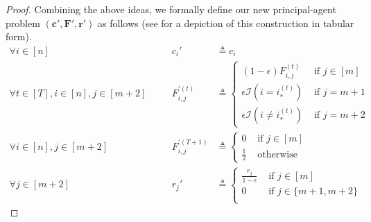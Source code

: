 \documentclass{article}
\newcommand{\indicator}[1]{\mathcal{I}\left(#1\right)}
\newcommand{\costvector}{\bm{c}}
\newcommand{\Cost}[1]{c_{#1}}
\newcommand{\TypedForecast}[3]{F^{(#1)}_{#2, #3}}
\newcommand{\ForecastTensor}{\bm{F}}
\newcommand{\rewardvector}{\bm{r}}
\newcommand{\Reward}[1]{r_{#1}}
\newcommand{\PrincipalAgentProblemPrime}{\left(\costvector', \ForecastTensor', \rewardvector'\right)}
\newcommand{\OptimalAction}{i_*}
\newcommand{\TypedOptimalAction}[1]{\OptimalAction^{(#1)}}
\newcommand{\forecastprime}[3]{F^{\prime(#1)}_{#2, #3}}
\begin{document}
\begin{proof}
  Combining the above ideas, we formally define our new principal-agent problem $\PrincipalAgentProblemPrime$ as follows (see  for a depiction of this construction in tabular form).
  \begin{alignat*}
    \forall i \in [n] \quad
    &&\Cost{i}' &\triangleq \Cost{i} \\
    \forall t \in [T], i \in [n], j \in [m+2] \quad
    &&\forecastprime{t}{i}{j} &\triangleq \begin{cases}
      (1 - \epsilon) \TypedForecast{t}{i}{j}               & \text{ if } j \in [m] \\
      \epsilon \indicator{i = \TypedOptimalAction{t}}      & \text{ if } j = m + 1 \\
      \epsilon \indicator{i \not = \TypedOptimalAction{t}} & \text{ if } j = m + 2
    \end{cases} \\
    \forall i \in [n], j \in [m+2] \quad
    &&\forecastprime{T+1}{i}{j} &\triangleq \begin{cases}
      0       & \text{ if } j \in [m] \\
      \frac12 & \text{ otherwise}
    \end{cases} \\
    \forall j \in [m+2] \quad
    &&\Reward{j}' &\triangleq \begin{cases}
      \frac{\Reward{j}}{1 - \epsilon} & \text{ if } j \in [m] \\
      0                               & \text{ if } j \in \{m+1, m+2\} \\
    \end{cases}
  \end{alignat*}
  

\end{proof}
\end{document}
